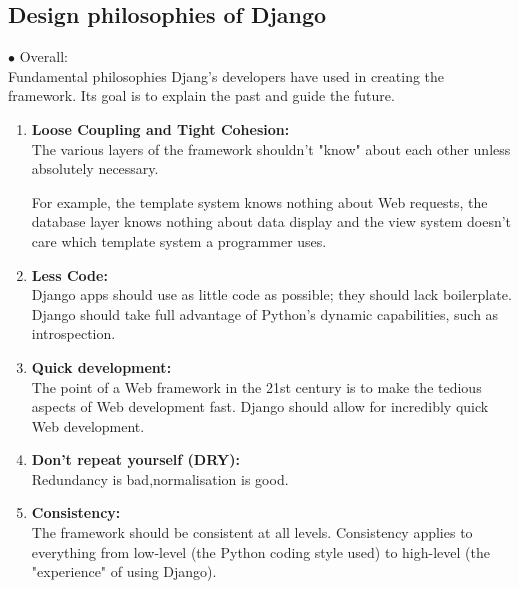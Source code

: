\subsection{Design philosophies of Django}
$\bullet$ Overall:\\
 Fundamental philosophies Djang's developers have used in creating the framework. Its goal is to explain the past and guide the future.
 \begin{enumerate}
 	\item \textbf{Loose Coupling and Tight Cohesion:}\\The various layers of the framework shouldn't "know" about each other unless absolutely necessary.
 	
 	For example, the template system knows nothing about Web requests, the database layer knows nothing about data display and the view system doesn't care which template system a programmer uses.
 	
 	\item \textbf{Less Code:}
 	\\Django apps should use as little code as possible; they should lack boilerplate. Django should take full advantage of Python's dynamic capabilities, such as introspection.
 	\item \textbf{Quick development:}
 	\\ The point of a Web framework in the 21st century is to make the tedious aspects of Web development fast. Django should allow for incredibly quick Web development.
 	
 	\item \textbf{Don't repeat yourself (DRY):}\\Redundancy is bad,normalisation is good.
 	
 	\item \textbf{Consistency:}\\ The framework should be consistent at all levels. Consistency applies to everything from low-level (the Python coding style used) to high-level (the "experience" of using Django).
 	
 \end{enumerate}

